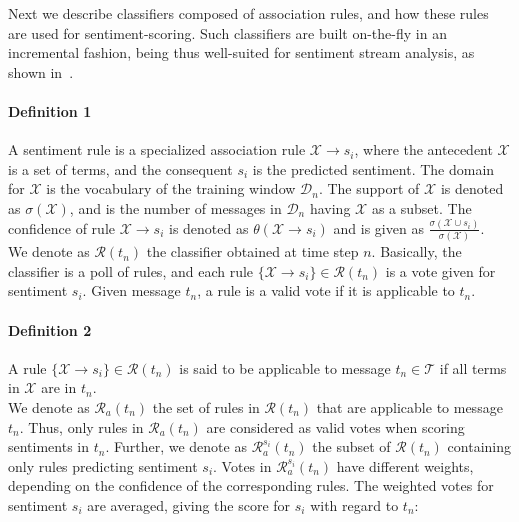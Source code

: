 Next we describe classifiers composed of association rules, and how these rules are used for sentiment-scoring. Such classifiers are built on-the-fly in an incremental fashion, being thus well-suited for sentiment stream analysis, as shown in~\cite{sigir}.

\paragraph*{\bf{Definition 1}} A sentiment rule is a specialized association rule $\mathcal{X}\xrightarrow{}s_i$, where the antecedent $\mathcal{X}$ is a set of terms, and the consequent $s_i$ is the predicted sentiment. The domain for $\mathcal{X}$ is the vocabulary of the training window $\mathcal{D}_n$.
The support of $\mathcal{X}$ is denoted as $\sigma(\mathcal{X})$, and is the number of messages in $\mathcal{D}_n$ having $\mathcal{X}$ as a subset. The confidence of rule $\mathcal{X}\xrightarrow{}s_i$ is denoted as $\theta(\mathcal{X}\xrightarrow{}s_i)$ and is given as $\displaystyle\frac{\sigma(\mathcal{X}\cup s_i)}{\sigma(\mathcal{X})}$.\\

We denote as $\mathcal{R}(t_n)$ the classifier obtained at time step $n$.
Basically, the classifier is a poll of rules, and each rule $\{\mathcal{X}\xrightarrow{}s_i\}\in\mathcal{R}(t_n)$ is a vote given for sentiment $s_i$. Given message $t_n$, a rule is a valid vote if it is applicable to $t_n$.

\paragraph*{\bf{Definition 2}} A rule $\{\mathcal{X}\xrightarrow{}s_i\}\in\mathcal{R}(t_n)$ is said to be applicable to message $t_n\in\mathcal{T}$ if
all terms in $\mathcal{X}$ are in $t_n$.\\

We denote as $\mathcal{R}_a(t_n)$ the set of rules in $\mathcal{R}(t_n)$ that are applicable to message $t_n$. Thus, only rules in $\mathcal{R}_a(t_n)$ are considered as valid votes when scoring sentiments in $t_n$.
Further, we denote as $\mathcal{R}^{s_i}_a(t_n)$ the subset of $\mathcal{R}(t_n)$ containing only rules predicting sentiment $s_i$.
Votes in $\mathcal{R}^{s_i}_a(t_n)$ have different weights, depending on the confidence of the corresponding rules. The weighted votes for sentiment $s_i$ are averaged, giving the score for $s_i$ with regard to $t_n$:

